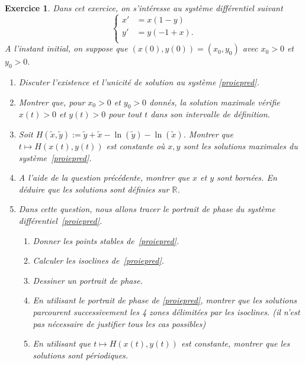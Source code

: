 \documentclass[11pt]{article}
\newcommand{\bR}{\mathbb R}
\theoremstyle{exostyle}
\newtheorem{exercice}{Exercice}
\begin{document}
\begin{exercice}
Dans cet exercice, on s’intéresse au système différentiel suivant 
\begin{equation} \label{proiepred}
\left\{ 
\begin{aligned}
x' &= x(1  -y) \\
y' &= y(- 1 +x). \\
\end{aligned} 
\right.
\end{equation}
A l'instant initial, on suppose que $(x(0), y(0))=(x_0 , y_0 )$ avec $x_0 > 0$ et $y_0 > 0$.
\begin{enumerate}
  \item  Discuter l'existence et l'unicité de solution au système  \eqref{proiepred}.
  \item Montrer que, pour $x_0 > 0$  et $y_0 > 0$ donnés, la solution maximale vérifie $x(t) > 0$ et $y(t) > 0$ pour tout $t$ dans son intervalle
de définition. 
  \item Soit $H(\tilde{x}, \tilde{y}) := \tilde{y}+\tilde{x} -\ln(\tilde{y}) - \ln(\tilde{x})$. Montrer que $ t \mapsto H(x(t),y(t))$ est constante où $x,y$ sont les solutions maximales du système~\eqref{proiepred}. 
\item A l'aide de la question précédente, montrer que $x$ et $y$ sont bornées. En déduire que les solutions sont définies sur $\bR$.

\item Dans cette question, nous allons tracer le portrait de phase du système différentiel~\eqref{proiepred}.
\begin{enumerate}
  \item Donner les points stables de~\eqref{proiepred}.
  \item Calculer les isoclines de~\eqref{proiepred}.
  \item Dessiner un portrait de phase.
  \item  En utilisant le portrait de phase de  \eqref{proiepred}, montrer que les solutions parcourent successivement les 4 zones délimitées par les isoclines. (il n’est pas nécessaire de justifier tous les cas possibles)
  \item En utilisant que $t \mapsto H(x(t),y(t))$ est constante, montrer que les solutions sont périodiques.
\end{enumerate}

\end{enumerate}
\end{exercice}
\end{document}
